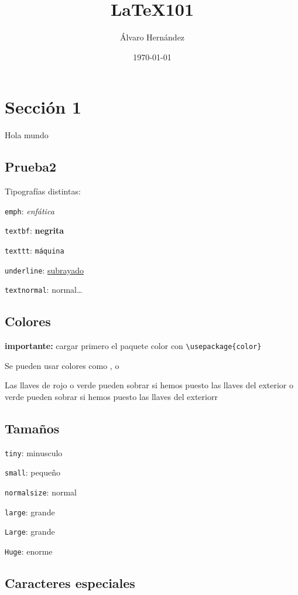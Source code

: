 \documentclass[12pt]{article}
\title{\LaTeX 101}
\author{Álvaro Hernández}
\date{\today}
\begin{document}

\maketitle
\tableofcontents
\newpage

\section{Sección 1}
Hola mundo

\subsection{Prueba2}
Tipografías distintas:

\texttt{emph}: \emph{enfática}

\texttt{textbf}: \textbf{negrita}

\texttt{texttt}: \texttt{máquina}

\texttt{underline}: \underline{subrayado}

\texttt{textnormal}: \textnormal{normal}\ldots

\subsection{Colores}

\textbf{importante: } cargar primero el paquete color con \verb|\usepackage{color}|

Se pueden usar colores como {\color{red}{ rojo}}, {\color{blue}{azul}} o {\color{green}{ verde}}

Las llaves de {rojo} o {verde} pueden sobrar si hemos puesto las llaves del exterior o {verde} pueden sobrar si hemos puesto las llaves del exteriorr

\subsection{Tamaños}

\texttt{tiny}: {\tiny{minusculo}}

\texttt{small}: {\small{pequeño}}

\texttt{normalsize}: {\normalsize{normal}}

\texttt{large}: {\large{grande}}

\texttt{Large}: {\Large{grande}}

\texttt{Huge}: {\Huge{enorme}}

\subsection{Caracteres especiales}
\end{document}
